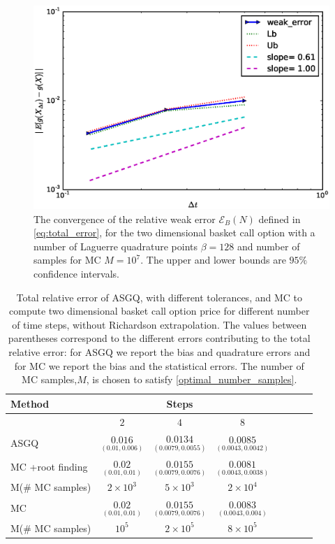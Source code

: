 \FloatBarrier
\begin{figure}[h!]
		\centering
		\includegraphics[width=0.4\linewidth]{./figures/basket_call_2d_time_stepping/weak_convergence/weak_convergence_order_basket_option_2d_relative_M_10_7_beta_128}

	\caption{The convergence of the relative weak error  $\mathcal{E}_B(N)$ defined in \ref{eq:total_error}, for the two dimensional basket call option with  a number of Laguerre  quadrature points  $\beta=128$ and number of samples for MC $M=10^7$. The upper and lower bounds are $95\%$ confidence intervals.}
	\label{fig:Weak_rate_two_dim_basket}
\end{figure}
\FloatBarrier


\FloatBarrier
\begin{table}[h!]
	\centering
	\begin{tabular}{l*{6}{c}r}
		\toprule[1.5pt]
	Method & & Steps  & &     \\
	\hline
           & $2$ & $4$ & $8$   \\
		\hline
		ASGQ   &  $\underset{(0.01,0.006)}{\mathbf{0.016}}$ & $\underset{(0.0079,0.0055)}{\mathbf{0.0134}}$ & $\underset{(0.0043,0.0042)}{\mathbf{0.0085}}$   \\

		\hline		
			MC +root finding   &  $\underset{(0.01,0.01)}{\mathbf{0.02}}$ & $\underset{(0.0079,0.0076)}{\mathbf{0.0155}}$ & $\underset{(0.0043,0.0038)}{\mathbf{0.0081}}$  \\
			M(\# MC samples)   & $2 \times 10^3$   &  $5 \times 10^3$ & $2 \times 10^4$  \\	
		\hline	
				MC   &  $\underset{(0.01,0.01)}{\mathbf{0.02}}$ & $\underset{(0.0079,0.0076)}{\mathbf{0.0155}}$ & $\underset{(0.0043,0.004)}{\mathbf{0.0083}}$   \\	
				M(\# MC samples)   &$10^5$  & $2 \times 10^5$  &  $8 \times 10^5$\\	
		
			\bottomrule[1.25pt]
	\end{tabular}
	\caption{Total relative  error of ASGQ, with different tolerances, and MC to compute two dimensional basket call option price for different number of time steps, without Richardson extrapolation. The values between parentheses correspond to the different errors contributing to the total relative error: for ASGQ we report the bias and quadrature errors and for MC we report the bias and the statistical errors. The number of MC samples,$ M$, is chosen to satisfy \eqref{optimal_number_samples}.}
	\label{Total error of MISC and MC to compute two  dim basket  Call option price of the different tolerances for different number of time steps, without Richardson extrapolation. The numbers between parentheses are the corresponding absolute errors.}
\end{table}
\FloatBarrier




